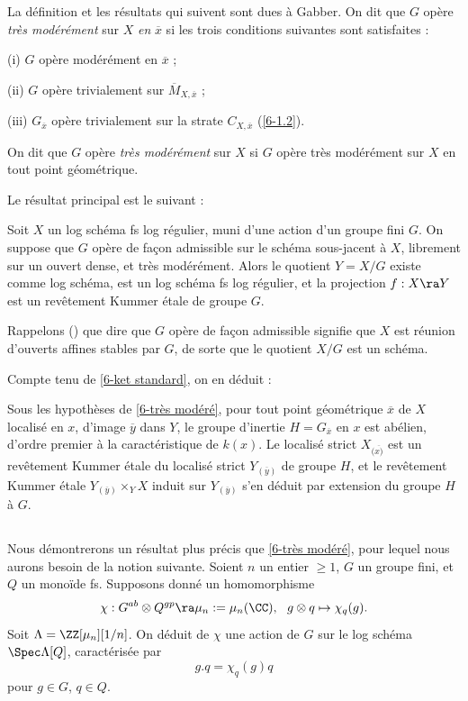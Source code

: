 \documentclass[10pt]{../fichiers-configuration-latex/smfart}
\begin{document}
La définition et les résultats qui suivent sont dues à Gabber. On dit que $G$ opère \textit{très
modérément} sur $X$ \textit{en} $\overline{x}$ si les trois conditions suivantes sont satisfaites :

(i) $G$ opère modérément en $\overline{x}$ ;

(ii) $G$ opère trivialement sur $\overline{M}_{X,\overline{x}}$ ;

(iii) $G_{\overline{x}}$ opère trivialement sur la strate $C_{X,\overline{x}}$ (\ref{6-1.2}).

On dit que $G$ opère \textit{très modérément} sur $X$ si $G$ opère très modérément sur $X$ en tout
point géométrique.

Le résultat principal est le suivant : \begin{theoreme}\label{6-très modéré}\label{6-tres modere}\label{6-3.2}
Soit $X$ un log schéma fs log régulier, muni d'une action d'un groupe fini $G$. On suppose que $G$
opère de façon admissible sur le schéma sous-jacent à $X$, librement sur un ouvert dense, et très
modérément. Alors le quotient $Y = X/G$ existe comme log schéma, est un log schéma fs log régulier,
et la projection $f : X \ra Y$ est un revêtement Kummer étale de groupe $G$.  \end{theoreme}
Rappelons () que dire que $G$ opère de façon admissible signifie que $X$ est réunion
d'ouverts affines stables par $G$, de sorte que le quotient $X/G$ est un schéma. 

Compte tenu de \ref{6-ket standard}, on en déduit : \begin{corollaire}\label{6-inertie abélienne}
Sous les hypothèses de \ref{6-très modéré}, pour tout point géométrique $\overline{x}$ de $X$
localisé en $x$, d'image $\overline{y}$ dans $Y$, le groupe d'inertie $H = G_{\overline{x}}$ en $x$
est abélien, d'ordre premier à la caractéristique de $k(x)$. Le localisé strict $X_{(\overline{x)}}$
est un revêtement Kummer étale du localisé strict $Y_{(\overline{y})}$ de groupe $H$, et le
revêtement Kummer étale $Y_{(\overline{y})} \times_Y X$ induit sur $Y_{(\overline{y})}$ s'en déduit
par extension du groupe $H$ à $G$.  \end{corollaire} \subsection{}\label{6-carte équivariante} Nous
démontrerons un résultat plus précis que \ref{6-très modéré}, pour lequel nous aurons besoin de la
notion suivante. Soient $n$ un entier $\ge 1$, $G$ un groupe fini, et $Q$ un monoïde fs. Supposons
donné un homomorphisme $$ \chi : G^{ab} \otimes Q^{gp} \ra \mu_n := \mu_n(\CC), \ \ g \otimes q
\mapsto \chi_q(g).  $$ Soit $\Lambda = \ZZ[\mu_n][1/n]$. On déduit de $\chi$  une action de $G$ sur
le log schéma $\Spec \Lambda[Q]$, caractérisée par $$ g.q = \chi_q(g)q $$ pour $g \in G$, $q \in Q$.
\end{document}
